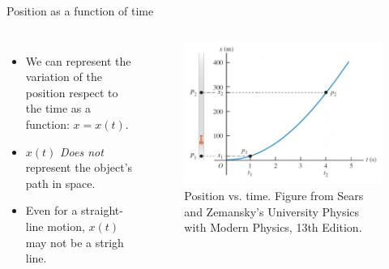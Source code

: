 \documentclass[]{beamer}
\begin{document}
\begin{frame}
Position as a function of time

   \begin{columns}[c]
   \column{2in}  %
  
\begin{itemize}
\item We can represent the variation of the position respect to the time as a function: $x=x(t)$.
\pause
\item $x(t)$ \textit{Does not} represent the object’s path in space.
\pause
\item Even for a straight-line motion, $x(t)$ may not be a strigh line.
\end{itemize}



   \column{2.5in}
   
   \begin{figure}[h!]
 
  \includegraphics[width=1.\textwidth]{images/3.jpg}
   \caption{Position vs. time. {\tiny Figure from Sears and Zemansky's University Physics 
   with Modern Physics, 13th Edition.} }
\end{figure}



   \end{columns}




 \end{frame}
\end{document}
